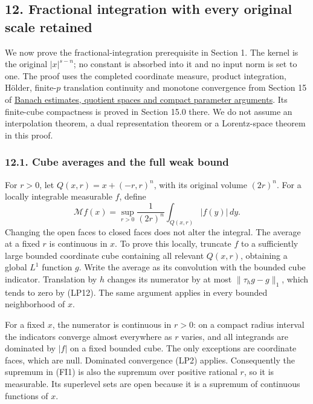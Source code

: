 \documentclass[
  11pt,
]{article}
\makeatletter
\let\ReaderOriginalAnchorStart\hyper@anchorstart
\let\ReaderOriginalAnchorEnd\hyper@anchorend
\let\ReaderPendingAliases\@empty
\def\ReaderArmAliases#1{\gdef\ReaderPendingAliases{#1}}
\def\hyper@anchorstart#1{\ReaderIfNativeAnchorTF{#1}{\ReaderPendingAliases\global\let\ReaderPendingAliases\@empty}{}\ReaderOriginalAnchorStart{#1}}
\makeatother
\begin{document}
\ReaderArmAliases{\ReaderOriginalAnchorStart{fractional-integration-with-every-original-scale-retained}\ReaderOriginalAnchorEnd}
\subsection{12. Fractional integration with every original scale
retained}\label{fractional-integration-with-every-original-scale-retained}

We now prove the fractional-integration prerequisite in Section 1. The
kernel is the original \(|x|^{s-n}\); no constant is absorbed into it
and no input norm is set to one. The proof uses the completed coordinate
measure, product integration, Hölder, finite-\(p\) translation
continuity and monotone convergence from Section 15 of
\href{banach-foundation-bridges.pdf}{Banach estimates, quotient spaces
and compact parameter arguments}. Its finite-cube compactness is proved
in Section 15.0 there. We do not assume an interpolation theorem, a dual
representation theorem or a Lorentz-space theorem in this proof.

\ReaderArmAliases{\ReaderOriginalAnchorStart{AN03-LCE-FRAC-001}\ReaderOriginalAnchorEnd\begingroup\expandafter\def\csname @currentHref\endcsname{AN03-LCE-FRAC-001}\label{AN03-LCE-FRAC-001}\endgroup\ReaderOriginalAnchorStart{cube-averages-and-the-full-weak-bound}\ReaderOriginalAnchorEnd}
\subsubsection{12.1. Cube averages and the full weak
bound}\label{cube-averages-and-the-full-weak-bound}

For \(r>0\), let \(Q(x,r)=x+(-r,r)^n\), with its original volume
\((2r)^n\). For a locally integrable measurable \(f\), define \[
 \mathcal Mf(x)=\sup_{r>0}\frac1{(2r)^n}
                         \int_{Q(x,r)}|f(y)|\,dy.              \tag{FI1}
\] Changing the open faces to closed faces does not alter the integral.
The average at a fixed \(r\) is continuous in \(x\). To prove this
locally, truncate \(f\) to a sufficiently large bounded coordinate cube
containing all relevant \(Q(x,r)\), obtaining a global \(L^1\) function
\(g\). Write the average as its convolution with the bounded cube
indicator. Translation by \(h\) changes its numerator by at most
\(\|\tau_hg-g\|_1\), which tends to zero by (LP12). The same argument
applies in every bounded neighborhood of \(x\).

For a fixed \(x\), the numerator is continuous in \(r>0\): on a compact
radius interval the indicators converge almost everywhere as \(r\)
varies, and all integrands are dominated by \(|f|\) on a fixed bounded
cube. The only exceptions are coordinate faces, which are null.
Dominated convergence (LP2) applies. Consequently the supremum in (FI1)
is also the supremum over positive rational \(r\), so it is measurable.
Its superlevel sets are open because it is a supremum of continuous
functions of \(x\).
\end{document}
